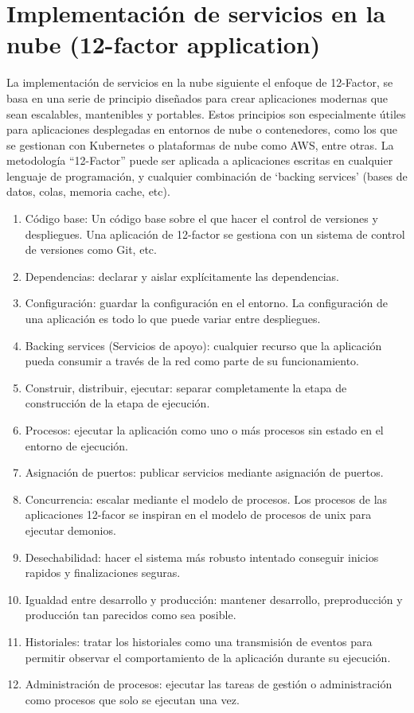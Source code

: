\documentclass[12pt]{article}
\begin{document}
\section*{Implementación de servicios en la nube (12-factor application)}
La implementación de servicios en la nube siguiente el enfoque de 12-Factor, se basa en una serie de principio diseñados para crear aplicaciones modernas que sean escalables, mantenibles y portables. Estos principios son especialmente útiles para aplicaciones desplegadas en entornos de nube o contenedores, como los que se gestionan con Kubernetes o plataformas de nube como AWS, entre otras.
La metodología “12-Factor” puede ser aplicada a aplicaciones escritas en cualquier lenguaje de programación, y cualquier combinación de ‘backing services’ (bases de datos, colas, memoria cache, etc).

\begin{enumerate}
\item Código base: Un código base sobre el que hacer el control de versiones y despliegues. Una aplicación de 12-factor se gestiona con un sistema de control de versiones como Git, etc.
\item Dependencias: declarar y aislar explícitamente las dependencias.
\item Configuración: guardar la configuración en el entorno. La configuración de una aplicación es todo lo que puede variar entre despliegues.
\item Backing services (Servicios de apoyo): cualquier recurso que la aplicación pueda consumir a través de la red como parte de su funcionamiento.
\item Construir, distribuir, ejecutar: separar completamente la etapa de construcción de la etapa de ejecución.
\item Procesos: ejecutar la aplicación como uno o más procesos sin estado en el entorno de ejecución.
\item Asignación de puertos: publicar servicios mediante asignación de puertos.
\item Concurrencia: escalar mediante el modelo de procesos. Los procesos de las aplicaciones 12-facor se inspiran en el modelo de procesos de unix para ejecutar demonios.
\item Desechabilidad: hacer el sistema más robusto intentado conseguir inicios rapidos y finalizaciones seguras.
\item Igualdad entre desarrollo y producción: mantener desarrollo, preproducción y producción tan parecidos como sea posible.
\item Historiales: tratar los historiales como una transmisión de eventos para permitir observar el comportamiento de la aplicación durante su ejecución.
\item Administración de procesos: ejecutar las tareas de gestión o administración como procesos que solo se ejecutan una vez.
\end{enumerate}
\end{document}
